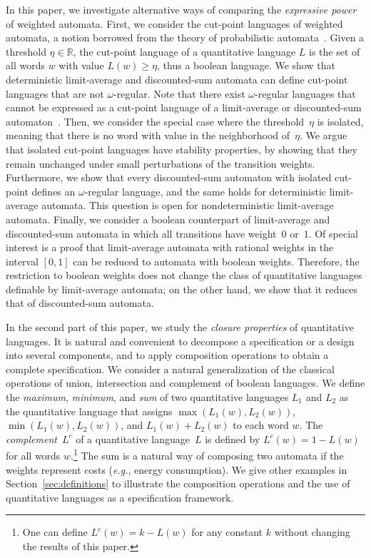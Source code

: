 \documentclass{llncs}
\newcommand{\real}{{\mathbb R}}
\begin{document}
In this paper, we investigate alternative ways of comparing the \emph{expressive power}
of weighted automata. First, we consider the cut-point languages of weighted
automata, a notion borrowed from the theory of probabilistic automata~\cite{Rabin63}.
Given a threshold $\eta \in \real$, the cut-point language of a quantitative
language $L$ is the set of all words $w$ with value $L(w) \geq \eta$, thus
a boolean language.
We show that deterministic limit-average and 
discounted-sum automata can define cut-point languages that are not 
$\omega$-regular. 
Note that there exist $\omega$-regular languages that cannot be expressed
as a cut-point language of a limit-average or discounted-sum automaton~\cite{CDH08}.
Then, we consider the special case where the threshold~$\eta$ is isolated, meaning
that there is no word with value in the neighborhood of~$\eta$. We argue that 
isolated cut-point languages have stability properties, by showing that they
remain unchanged under small perturbations of the transition weights. 
Furthermore, we show that every discounted-sum automaton with isolated cut-point defines
an $\omega$-regular language, and the same holds for deterministic limit-average
automata. This question is open for nondeterministic limit-average automata.
Finally, we consider a boolean counterpart of limit-average and discounted-sum 
automata in which all transitions have weight~$0$ or~$1$.
Of special interest is a proof that limit-average automata with rational weights in 
the interval $[0,1]$ can be reduced to automata with boolean weights.
Therefore, the restriction to boolean weights does not change the class of quantitative 
languages definable by limit-average automata; on the other hand, we show that it reduces that of
discounted-sum automata. 


In the second part of this paper, we study the \emph{closure properties} of quantitative languages.
It is natural and convenient to decompose a specification or a design 
into several components, and to apply composition operations
to obtain a complete specification. 
We consider a natural generalization of the classical operations
of union, intersection and complement of boolean languages. We define the \emph{maximum}, 
\emph{minimum}, and \emph{sum} of two quantitative languages $L_1$ and $L_2$ as the quantitative language
that assigns $\max(L_1(w),L_2(w))$, $\min(L_1(w),L_2(w))$, and $L_1(w) + L_2(w)$
to each word $w$. 
The \emph{complement}~$L^c$ of a quantitative language~$L$ is defined by $L^c(w) = 1-L(w)$
for all words $w$.\footnote{One can define $L^c(w) = k-L(w)$ for any constant $k$ without changing 
the results of this paper.}   The sum is a natural way of composing two automata
if the weights represent costs ({\it e.g.}, energy consumption). 
We give other examples in Section~\ref{sec:definitions} to illustrate 
the composition operations and the use of quantitative languages 
as a specification framework.
\end{document}

